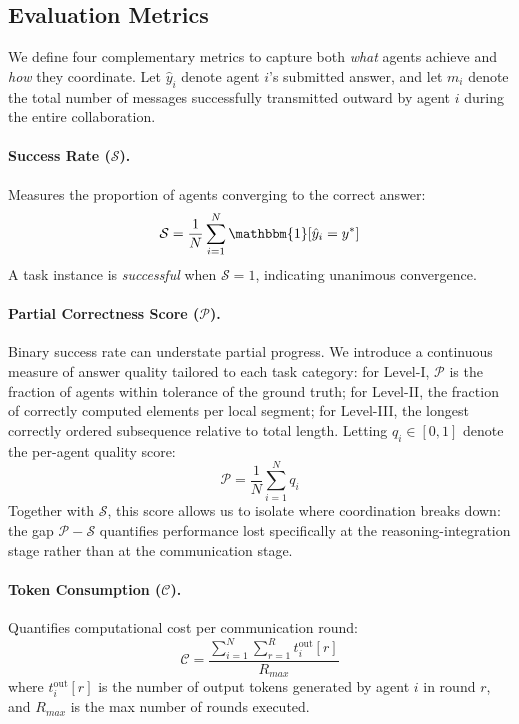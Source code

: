 \subsection{Evaluation Metrics}
\label{sec:metrics}

We define four complementary metrics to capture both \textit{what} agents achieve and \textit{how} they coordinate. 
Let $\hat{y}_i$ denote agent $i$'s submitted answer, and let $m_i$ denote the total number of messages successfully transmitted outward by agent $i$ during the entire collaboration.

\paragraph{Success Rate ($\mathcal{S}$).}
Measures the proportion of agents converging to the correct answer:
\begin{equation}
\mathcal{S} = \frac{1}{N} \sum_{i=1}^{N} \mathbbm{1}[\hat{y}_i = y^*]
\end{equation}
A task instance is \textit{successful} when $\mathcal{S} = 1$, indicating unanimous convergence.

\paragraph{Partial Correctness Score ($\mathcal{P}$).}
Binary success rate can understate partial progress. 
We introduce a continuous measure of answer quality tailored to each task category: for Level-I, $\mathcal{P}$ is the fraction of agents within tolerance of the ground truth; for Level-II, the fraction of correctly computed elements per local segment; for Level-III, the longest correctly ordered subsequence relative to total length. 
Letting $q_i \in [0,1]$ denote the per-agent quality score:
\begin{equation}
\mathcal{P} = \frac{1}{N} \sum_{i=1}^{N} q_i
\end{equation}
Together with $\mathcal{S}$, this score allows us to isolate where coordination breaks down: the gap $\mathcal{P} - \mathcal{S}$ quantifies performance lost specifically at the reasoning-integration stage rather than at the communication stage.

\paragraph{Token Consumption ($\mathcal{C}$).}
Quantifies computational cost per communication round:
\begin{equation}
\mathcal{C} = \frac{\sum_{i=1}^{N} \sum_{r=1}^{R} t_i^{\text{out}}[r]}{R_{max}}
\end{equation}
where $t_i^{\text{out}}[r]$ is the number of output tokens generated by agent $i$ in round $r$, and $R_{max}$ is the max number of rounds executed.

